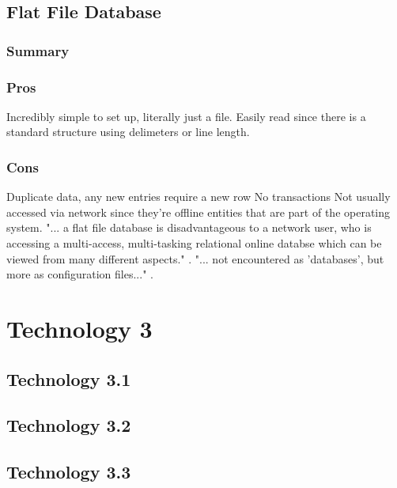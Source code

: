 \documentclass[draftclsnofoot,onecolumn,letterpaper,10pt,compsoc]{IEEEtran}
\begin{document}
        
	\subsection{Flat File Database}
        \subsubsection{Summary}
    
        \subsubsection{Pros}
            Incredibly simple to set up, literally just a file.
            Easily read since there is a standard structure using delimeters or line length.
    
        \subsubsection{Cons}
            Duplicate data, any new entries require a new row
            No transactions
            Not usually accessed via network since they're offline entities that are part of the operating system\cite{Techwalla}.
            "... a flat file database is disadvantageous to a network user, who is accessing a multi-access, multi-tasking relational online databse which can be viewed from many different aspects." \cite{Techwalla}.
            "... not encountered as 'databases', but more as configuration files..." \cite{Techwalla}.


\section{Technology 3}
	\subsection{Technology 3.1}
    
	\subsection{Technology 3.2}
	\subsection{Technology 3.3}

{}

\end{document}

